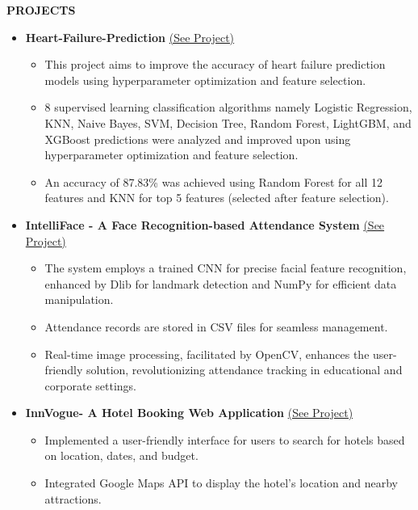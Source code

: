 \documentclass[a4paper,10pt]{article}
\newcommand{\resheading}[1]{\medskip
    \colorbox{mygrey}{\begin{minipage}{\dimexpr\textwidth-2\fboxsep\relax}\small 
                        \textbf{#1 \vphantom{p\^{E}}}
                      \end{minipage}}
                            \par\medskip}
\begin{document}
            

\resheading{PROJECTS}

\begin{itemize}
    \item \textbf{Heart-Failure-Prediction}   \href{https://github.com/khushiisaxena/Heart-Failure-Prediction}{(See Project)}

    \begin{itemize}
        \item  This project aims to improve the accuracy of heart failure prediction models using hyperparameter optimization and feature selection.
        \item 8 supervised learning classification algorithms namely Logistic Regression, KNN, Naive Bayes, SVM, Decision Tree, Random Forest, LightGBM, and XGBoost predictions were analyzed and improved upon using hyperparameter optimization and feature selection.
        \item An accuracy of 87.83\% was achieved using Random Forest for all 12 features and KNN for top 5 features (selected after feature selection).
    \end{itemize}
\end{itemize}

 \begin{itemize}
    \item \textbf{IntelliFace - A Face Recognition-based Attendance System} \href{https://github.com/khushiisaxena/Intelliface}{(See Project)}
    \begin{itemize}
        \item  The system employs a trained CNN for precise facial feature recognition, enhanced by Dlib for landmark detection and NumPy for efficient data manipulation.
        \item Attendance records are stored in CSV files for seamless management.
        \item Real-time image processing, facilitated by OpenCV, enhances the user-friendly solution, revolutionizing attendance tracking in educational and corporate settings.
    \end{itemize}
\end{itemize}

    \begin{itemize}
    \item \textbf{InnVogue- A Hotel Booking Web Application} \href{https://github.com/khushiisaxena/InnVogue.com/tree/master}{(See Project)}
    \begin{itemize}
        \item  Implemented a user-friendly interface for users to search for hotels based on location, dates, and budget.
        \item     Integrated Google Maps API to display the hotel's location and nearby attractions.
    \end{itemize}
\end{itemize}
\end{document}
